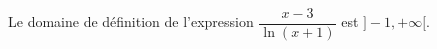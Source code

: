 Le domaine de définition de l'expression $\dfrac{x-3}{\ln(x+1)}$ est $]-1,+\infty[$.

\begin{reponses}
\end{reponses}

